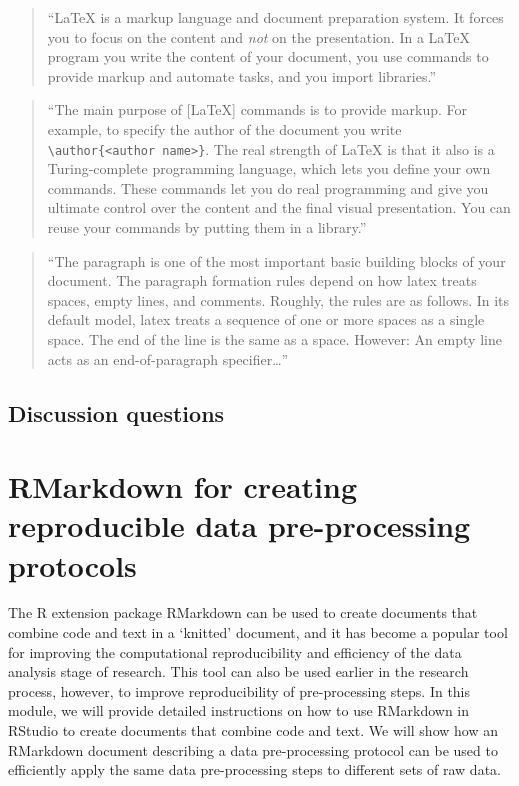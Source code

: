 \documentclass[]{tufte-book}
\begin{document}
\begin{quote}
``LaTeX is a markup language and document preparation system. It forces you
to focus on the content and \emph{not} on the presentation. In a LaTeX program
you write the content of your document, you use commands to provide markup
and automate tasks, and you import libraries.'' \citep{van2012latex}
\end{quote}

\begin{quote}
``The main purpose of {[}LaTeX{]} commands is to provide markup. For example,
to specify the author of the document you write \texttt{\textbackslash{}author\{\textless{}author\ name\textgreater{}\}}.
The real strength of LaTeX is that it also is a Turing-complete programming
language, which lets you define your own commands. These commands let you do
real programming and give you ultimate control over the content and the
final visual presentation. You can reuse your commands by putting them in
a library.'' \citep{van2012latex}
\end{quote}

\begin{quote}
``The paragraph is one of the most important basic building blocks of your
document. The paragraph formation rules depend on how latex treats spaces,
empty lines, and comments. Roughly, the rules are as follows. In its default
model, latex treats a sequence of one or more spaces as a single space. The
end of the line is the same as a space. However: An empty line acts
as an end-of-paragraph specifier\ldots{}'' \citep{van2012latex}
\end{quote}

\hypertarget{discussion-questions-6}{%
\subsection{Discussion questions}\label{discussion-questions-6}}

\hypertarget{module19}{%
\section{RMarkdown for creating reproducible data pre-processing protocols}\label{module19}}

The R extension package RMarkdown can be used to create documents that combine
code and text in a `knitted' document, and it has become a popular tool for
improving the computational reproducibility and efficiency of the data analysis
stage of research. This tool can also be used earlier in the research process,
however, to improve reproducibility of pre-processing steps. In this module, we
will provide detailed instructions on how to use RMarkdown in RStudio to create
documents that combine code and text. We will show how an RMarkdown document
describing a data pre-processing protocol can be used to efficiently apply the
same data pre-processing steps to different sets of raw data.
\end{document}
